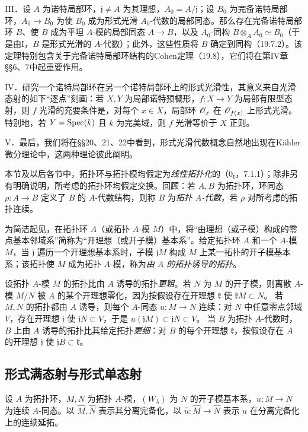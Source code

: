 \noindent III．设 $A$ 为诺特局部环，$\mathfrak j\ne A$ 为其理想，$A_0=A/\mathfrak j$；设 $B_0$ 为完备诺特局部环，$A_0\to B_0$ 为使 $B_0$ 成为形式光滑 $A_0$-代数的局部同态。那么存在完备诺特局部环 $B$、使 $B$ 成为平坦 $A$-模的局部同态 $A\to B$，以及 $A_0$-同构 $B\otimes_AA_0\simeq B_0$（于是由I，$B$ 是形式光滑的 $A$-代数）；此外，这些性质将 $B$ 确定到同构（19.7.2）。该定理特别包含关于完备诺特局部环结构的Cohen定理（19.8），它们将在第IV章§§6、7中起重要作用。

\noindent IV．研究一个诺特局部环在另一个诺特局部环上的形式光滑性，其意义来自光滑态射的如下“逐点”刻画：若 $X,Y$ 为局部诺特预概形，$f:X\to Y$ 为局部有限型态射，则 $f$ 光滑的充要条件是，对每个 $x\in X$，局部环 $\mathscr O_x$ 在 $\mathscr O_{f(x)}$ 上形式光滑。特别地，若 $Y=\operatorname{Spec}(k)$ 且 $k$ 为完美域，则 $f$ 光滑等价于 $X$ 正则。

\noindent V．最后，我们将在§§20、21、22中看到，形式光滑代数概念自然地出现在Kähler微分理论中，这两种理论彼此阐明。

本节及以后各节中，拓扑环与拓扑模均假定为\emph{线性拓扑化}的（$0_{\mathrm I}$，7.1.1）；除非另有明确说明，所考虑的拓扑环均假定交换。回顾：若 $A,B$ 为拓扑环，环同态 $\rho:A\to B$ 定义了 $B$ 的 $A$-代数结构，则称 $B$ 为\emph{拓扑 $A$-代数}，若 $\rho$ 对所考虑的拓扑连续。

为简洁起见，在拓扑环 $A$（或拓扑 $A$-模 $M$）中，将“由理想（或子模）构成的零点基本邻域系”简称为“开理想（或开子模）基本系”。给定拓扑环 $A$ 和一个 $A$-模 $M$，当 $\mathfrak j$ 遍历一个开理想基本系时，子模 $\mathfrak jM$ 构成 $M$ 上某一拓扑的开子模基本系；该拓扑使 $M$ 成为拓扑 $A$-模，称为\emph{由 $A$ 的拓扑诱导的拓扑}。

设拓扑 $A$-模 $M$ 的拓扑比由 $A$ 诱导的拓扑\emph{更粗}。若 $N$ 为 $M$ 的开子模，则离散 $A$-模 $M/N$ 被 $A$ 的某个开理想零化，因为按假设存在开理想 $\mathfrak k$ 使 $\mathfrak kM\subset N$。
若 $M,N$ 的拓扑都由 $A$ 诱导，则每个 $A$-同态 $u:M\to N$ 连续：对 $N$ 中任意零点邻域 $V$，存在开理想 $\mathfrak j$ 使 $\mathfrak jN\subset V$，于是 $u(\mathfrak jM)\subset\mathfrak jN\subset V$。
当 $B$ 为拓扑 $A$-代数时，$B$ 上由 $A$ 诱导的拓扑比其给定拓扑\emph{更细}：对 $B$ 的每个开理想 $\mathfrak k$，按假设存在 $A$ 的开理想 $\mathfrak j$ 使 $\mathfrak jB\subset\mathfrak k$。

\subsection{形式满态射与形式单态射}
设 $A$ 为拓扑环，$M,N$ 为拓扑 $A$-模，$(W_\lambda)$ 为 $N$ 的开子模基本系，$u:M\to N$ 为连续 $A$-同态。以 $\widehat M,\widehat N$ 表示其分离完备化，以 $\widehat u:\widehat M\to\widehat N$ 表示 $u$ 在分离完备化上的连续延拓。

